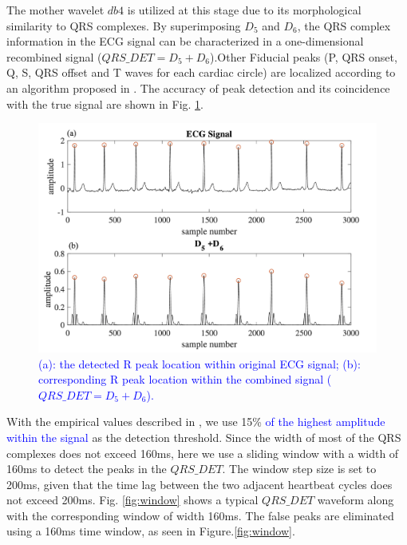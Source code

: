The mother wavelet $db4$ is utilized at this stage due to its morphological similarity to QRS complexes\cite{martinez2004wavelet}. By superimposing $D_5$ and $D_6$, the QRS complex information in the ECG signal can be characterized in a one-dimensional recombined signal ($QRS\_DET = D_5+D_6$).Other Fiducial peaks (P, QRS onset, Q, S, QRS offset and T waves for each cardiac circle) are localized according to an algorithm proposed in \cite{2012qrs}. The accuracy of peak detection and its coincidence with the true signal are shown in Fig. \ref{fig:QRS_d5d6}.

\begin{figure}[t]
\centering
\includegraphics[scale=.5]{Fig/QRS_D5D6_sub.png}
\caption{\textcolor{blue}{(a): the detected R peak location within original ECG signal; (b): corresponding R peak location within the combined signal ($QRS\_DET = D_5+D_6$).} }
\label{fig:QRS_d5d6}
\end{figure}


With the empirical values described in \cite{2012qrs}, we use 15\% \textcolor{blue}{of the highest amplitude within the signal} as the detection threshold. Since the width of most of the QRS complexes does not exceed 160ms, here we use a sliding window with a width of 160ms to detect the peaks in the $QRS\_DET$. The window step size is set to 200ms, given that the time lag between the two adjacent heartbeat cycles does not exceed 200ms.  Fig. \ref{fig:window} shows a typical $QRS\_DET$ waveform along with the corresponding window of width 160ms. The false peaks are eliminated using a 160ms time window, as seen in Figure.\ref{fig:window}.



